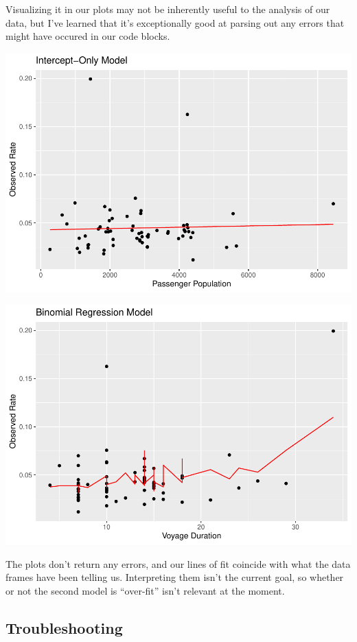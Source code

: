 \documentclass[
  11,
]{book}
\begin{document}
Visualizing it in our plots may not be inherently useful to the analysis of our data, but I've learned that it's exceptionally good at parsing out any errors that might have occured in our code blocks.

\includegraphics{_main_files/figure-latex/predm1_plot2-1.pdf}

\includegraphics{_main_files/figure-latex/predm2_plot2-1.pdf}

The plots don't return any errors, and our lines of fit coincide with what the data frames have been telling us. Interpreting them isn't the current goal, so whether or not the second model is ``over-fit'' isn't relevant at the moment.

\hypertarget{troubleshooting}{%
\subsection*{Troubleshooting}\label{troubleshooting}}
\end{document}
